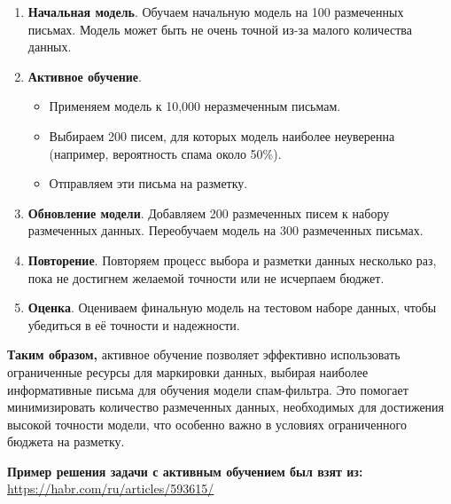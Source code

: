 \documentclass{article}
\begin{document}
\begin{enumerate}
    \item \textbf{Начальная модель}. Обучаем начальную модель на 100 размеченных письмах. Модель может быть не очень точной из-за малого количества данных.
    \item \textbf{Активное обучение}.
    \begin{itemize}
        \item Применяем модель к 10,000 неразмеченным письмам.
        \item Выбираем 200 писем, для которых модель наиболее неуверенна (например, вероятность спама около 50\%).
        \item Отправляем эти письма на разметку.
    \end{itemize}
    \item \textbf{Обновление модели}. Добавляем 200 размеченных писем к набору размеченных данных. Переобучаем модель на 300 размеченных письмах.
    \item \textbf{Повторение}. Повторяем процесс выбора и разметки данных несколько раз, пока не достигнем желаемой точности или не исчерпаем бюджет.
    \item \textbf{Оценка}. Оцениваем финальную модель на тестовом наборе данных, чтобы убедиться в её точности и надежности.
\end{enumerate}

\noindent \textbf{Таким образом,} активное обучение позволяет эффективно использовать ограниченные ресурсы для маркировки данных, выбирая наиболее информативные письма для обучения модели спам-фильтра. Это помогает минимизировать количество размеченных данных, необходимых для достижения высокой точности модели, что особенно важно в условиях ограниченного бюджета на разметку.

\quad

\noindent \textbf{Пример решения задачи с активным обучением был взят из:} \url{https://habr.com/ru/articles/593615/}
\end{document}
